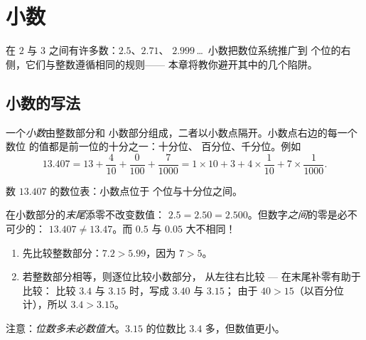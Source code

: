 \chapter{小数}\label{ch:g6:decimals}

在 $2$ 与 $3$ 之间有许多数：$2.5$、$2.71$、
$2.999$\,\dots\ 小数把数位系统推广到
个位的右侧，它们与整数遵循相同的规则——
本章将教你避开其中的几个陷阱。

\section{小数的写法}

\begin{definition}[小数的数位]\label{def:g6:decimals:places}
一个\emph{小数}由整数部分和
小数部分组成，二者以小数点隔开。小数点右边的每一个数位
的值都是前一位的十分之一：十分位、
百分位、千分位。例如
\[
13.407 = 13 + \frac{4}{10} + \frac{0}{100} + \frac{7}{1000}
= 1 \times 10 + 3 + 4 \times \frac{1}{10} + 7 \times \frac{1}{1000}.
\]
\end{definition}

\begin{omfigure}

{\small 数 $13.407$ 的数位表：小数点位于
个位与十分位之间。}
\end{omfigure}

\begin{remark}[有意义的零与无意义的零]
在小数部分的\emph{末尾}添零不改变数值：
$2.5 = 2.50 = 2.500$。但数字\emph{之间}的零是必不可少的：
$13.407 \neq 13.47$。而 $0.5$ 与 $0.05$ 大不相同！
\end{remark}

\begin{method}[比较小数的大小]\label{met:g6:decimals:compare}
\begin{enumerate}
  \item 先比较整数部分：$7.2 > 5.99$，因为 $7 > 5$。
  \item 若整数部分相等，则逐位比较小数部分，
        从左往右比较 --- 在末尾补零有助于比较：
        比较 $3.4$ 与 $3.15$ 时，写成 $3.40$ 与 $3.15$；
        由于 $40 > 15$（以百分位计），所以 $3.4 > 3.15$。
\end{enumerate}
注意：\emph{位数多未必数值大}。$3.15$ 的位数比
$3.4$ 多，但数值更小。
\end{method}

